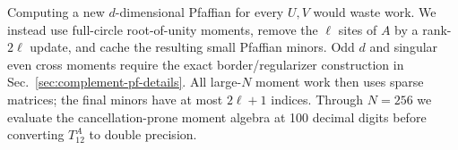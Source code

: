 Computing a new $d$-dimensional Pfaffian for every $U,V$ would waste
work. We instead use full-circle root-of-unity moments, remove the
$\ell$ sites of $A$ by a rank-$2\ell$ update, and cache the resulting
small Pfaffian minors. Odd $d$ and singular even cross moments require
the exact border/regularizer construction in
Sec.~\ref{sec:complement-pf-details}. All large-$N$ moment work then
uses sparse matrices; the final minors have at most $2\ell+1$ indices.
Through $N=256$ we evaluate the cancellation-prone moment algebra at 100 decimal digits
before converting $T_{12}^A$ to double precision.


